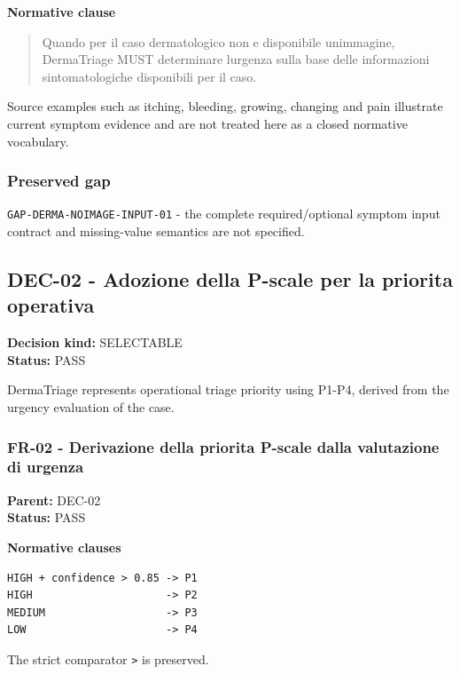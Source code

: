 \documentclass[11pt,a4paper]{article}
\begin{document}
\textbf{Normative clause}

\begin{quote}
Quando per il caso dermatologico non e\textquotesingle{} disponibile
un\textquotesingle immagine, DermaTriage MUST determinare
l\textquotesingle urgenza sulla base delle informazioni sintomatologiche
disponibili per il caso.
\end{quote}

Source examples such as itching, bleeding, growing, changing and pain
illustrate current symptom evidence and are not treated here as a closed
normative vocabulary.

\subsubsection{Preserved gap}\label{preserved-gap}

\texttt{GAP-DERMA-NOIMAGE-INPUT-01} - the complete required/optional
symptom input contract and missing-value semantics are not specified.

\subsection{DEC-02 - Adozione della P-scale per la
priorita\textquotesingle{}
operativa}\label{dec-02---adozione-della-p-scale-per-la-priorita-operativa}

\textbf{Decision kind:} SELECTABLE\\
\textbf{Status:} PASS

DermaTriage represents operational triage priority using P1-P4, derived
from the urgency evaluation of the case.

\subsubsection{FR-02 - Derivazione della priorita\textquotesingle{}
P-scale dalla valutazione di
urgenza}\label{fr-02---derivazione-della-priorita-p-scale-dalla-valutazione-di-urgenza}

\textbf{Parent:} DEC-02\\
\textbf{Status:} PASS

\textbf{Normative clauses}

\begin{verbatim}
HIGH + confidence > 0.85 -> P1
HIGH                     -> P2
MEDIUM                   -> P3
LOW                      -> P4
\end{verbatim}

The strict comparator \texttt{\textgreater{}} is preserved.
\end{document}
